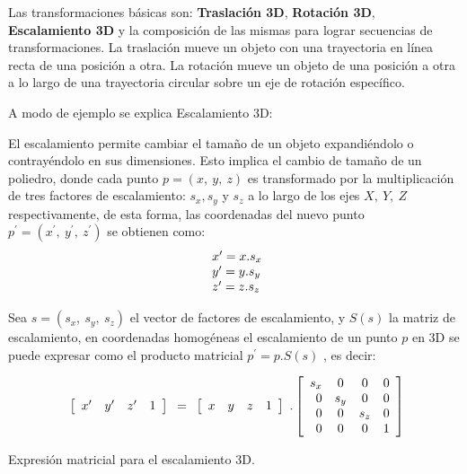 Las transformaciones básicas son:  \textbf{Traslación  3D}, \textbf{Rotación  3D}, \textbf{Escalamiento  3D} y la composición de las mismas para lograr secuencias de transformaciones.
La traslación mueve un objeto con una trayectoria en línea recta de una posición a otra. La rotación mueve un objeto de una posición a otra a lo largo de una trayectoria circular sobre un eje de rotación específico.


\vspace{5mm}
A modo de ejemplo se explica Escalamiento 3D:

El escalamiento permite cambiar el tamaño de un objeto expandiéndolo o contrayéndolo en sus dimensiones. %
Esto implica el cambio de tamaño de un poliedro, donde cada punto $p = (x,\ y,\ z)$ es transformado por la multiplicación de tres factores de escalamiento: $s_{x}, s_{y}$ y $s_{z}$ a lo largo de los ejes $X,\ Y,\ Z$ respectivamente, de esta forma, las coordenadas del nuevo punto $p^{\prime} = ({x}^{ \prime},\ {y}^{ \prime},\ {z}^{ \prime})$ se obtienen como:
$$
\begin{array}{l@{}l}
{x}^{\prime} = x.s_{x}
\\
{y}^{\prime} = y.s_{y}
\\
{z}^{\prime} = z.s_{z}
\end{array}
$$


Sea $s = (s_{x},\ s_{y},\ s_{z})$ el vector de factores de escalamiento, y $S(s)$ la matriz de
escalamiento, en coordenadas homogéneas \citep{santalo1966geometria} el escalamiento de un punto $p$ en 3D se puede expresar como el producto matricial
$p^{\prime} = p.S(s)$ , es decir:

\begin{equation}
\begin{array}{rccl}
\left[
\begin{array}{rccl}
{x}^{\prime} & {y}^{\prime} & {z}^{\prime} & 1\\
\end{array}
\right]
\end{array}
=
\begin{array}{rccl}
\left[
\begin{array}{rccl}
x & y & z & 1\newline
\end{array}
\right]
\end{array} 
.
\left[
\begin{array}{rccl}
s_{x} & 0 & 0 & 0\\
0 & s_{y} & 0 & 0\\
0 & 0 & s_{z} & 0\\
0 & 0 & 0 & 1\\
\end{array}
\right]   
\end{equation}
\begin{center}
\footnotesize{Expresión matricial para el escalamiento 3D.}
\end{center}

